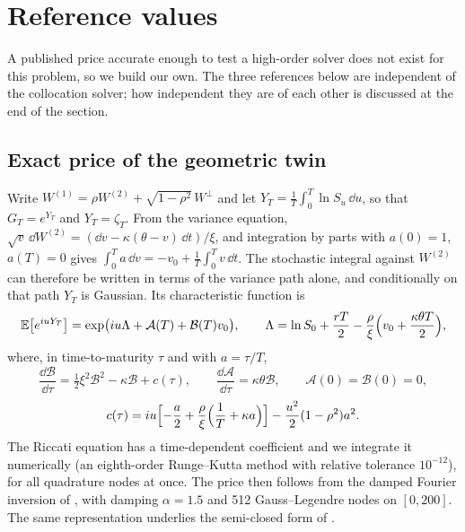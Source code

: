 \section{Reference values}\label{sec:references}

A published price accurate enough to test a high-order solver does not exist for this problem, so we
build our own. The three references below are independent of the collocation solver; how independent
they are of each other is discussed at the end of the section.

\subsection{Exact price of the geometric twin}\label{sec:geoexact}

Write $W^{(1)} = \rho W^{(2)} + \sqrt{1-\rho^2}\,W^{\perp}$ and let $Y_T = \frac1T\int_0^T\ln S_u\,\dd u$,
so that $G_T=e^{Y_T}$ and $Y_T=\zeta_T$. From the variance equation,
$\sqrt{v}\,\dd W^{(2)} = (\dd v - \kappa(\theta-v)\,\dd t)/\xi$, and integration by parts with $a(0)=1$,
$a(T)=0$ gives $\int_0^T a\,\dd v = -v_0 + \frac1T\int_0^T v\,\dd t$. The stochastic integral against
$W^{(2)}$ can therefore be written in terms of the variance path alone, and conditionally on that path
$Y_T$ is Gaussian. Its characteristic function is
\begin{equation}\label{eq:geochf}
\mathbb{E}\bigl[e^{iuY_T}\bigr] = \exp\bigl(iu\Lambda + \mathcal A(T) + \mathcal B(T)v_0\bigr),\qquad
\Lambda = \ln S_0 + \frac{rT}{2} - \frac\rho\xi\Bigl(v_0 + \frac{\kappa\theta T}{2}\Bigr),
\end{equation}
where, in time-to-maturity $\tau$ and with $a=\tau/T$,
\begin{equation}\label{eq:georiccati}
\frac{\dd\mathcal B}{\dd\tau} = \tfrac12\xi^2\mathcal B^2 - \kappa\mathcal B + c(\tau),\qquad
\frac{\dd\mathcal A}{\dd\tau} = \kappa\theta\mathcal B,\qquad \mathcal A(0)=\mathcal B(0)=0,
\end{equation}
\begin{equation*}
c(\tau) = iu\Bigl[-\frac a2 + \frac\rho\xi\Bigl(\frac1T + \kappa a\Bigr)\Bigr] - \frac{u^2}{2}(1-\rho^2)a^2 .
\end{equation*}
The Riccati equation has a time-dependent coefficient and we integrate it numerically (an eighth-order
Runge--Kutta method with relative tolerance $10^{-12}$), for all quadrature nodes at once. The price then
follows from the damped Fourier inversion of \citet{CarrMadan1999}, with damping $\alpha=1.5$ and
512 Gauss--Legendre nodes on $[0,200]$. The same representation underlies the semi-closed form of
\citet{KimWee2014}.

